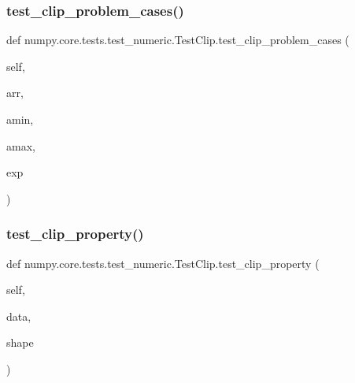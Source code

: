 \subsubsection{\texorpdfstring{test\+\_\+clip\+\_\+problem\+\_\+cases()}{test\_clip\_problem\_cases()}}
{\footnotesize\ttfamily def numpy.\+core.\+tests.\+test\+\_\+numeric.\+Test\+Clip.\+test\+\_\+clip\+\_\+problem\+\_\+cases (\begin{DoxyParamCaption}\item[{}]{self,  }\item[{}]{arr,  }\item[{}]{amin,  }\item[{}]{amax,  }\item[{}]{exp }\end{DoxyParamCaption})}

\mbox{\label{classnumpy_1_1core_1_1tests_1_1test__numeric_1_1TestClip_abc2292189a556449b1f0d1547db18145}} 
\subsubsection{\texorpdfstring{test\+\_\+clip\+\_\+property()}{test\_clip\_property()}}
{\footnotesize\ttfamily def numpy.\+core.\+tests.\+test\+\_\+numeric.\+Test\+Clip.\+test\+\_\+clip\+\_\+property (\begin{DoxyParamCaption}\item[{}]{self,  }\item[{}]{data,  }\item[{}]{shape }\end{DoxyParamCaption})}

